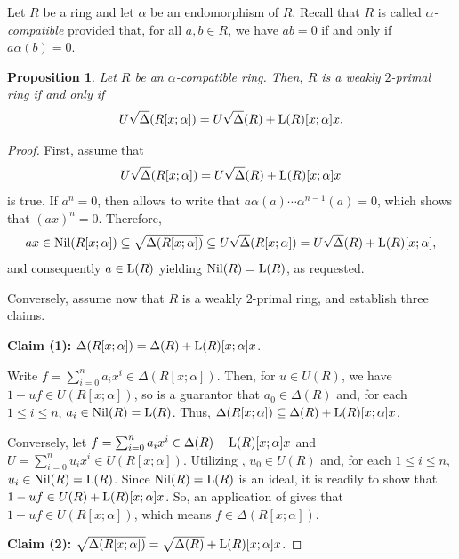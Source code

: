 \documentclass[11pt]{amsart}
\newtheorem{proposition}[theorem]{Proposition}
\theoremstyle{definition}
\begin{document}
Let \( R \) be a ring and let \( \alpha \) be an endomorphism of \( R \). Recall that \( R \) is called \textit{\(\alpha\)-compatible} provided that, for all \( a, b \in R \), we have $ab = 0$ if and only if $a\alpha(b) = 0$.

\begin{proposition}
Let $R$ be an $\alpha$-compatible ring. Then, $R$ is a weakly $2$-primal ring if and only if
$$U\sqrt{\Delta}(R[x; \alpha]) = U\sqrt{\Delta}(R) + {\rm L}(R)[x; \alpha]x.$$
\end{proposition}

\begin{proof}
First, assume that $$U\sqrt{\Delta}(R[x; \alpha]) = U\sqrt{\Delta}(R) + {\rm L}(R)[x; \alpha]x$$ is true. If $a^n=0$, then \cite[Lemma~2.1]{chen} allows to write that $a\alpha(a)\cdots\alpha^{n-1}(a)=0$, which shows that $(ax)^n=0$. Therefore, $$ax \in {\rm Nil}(R[x; \alpha]) \subseteq \sqrt{\Delta(R[x; \alpha])} \subseteq U\sqrt{\Delta}(R[x; \alpha]) = U\sqrt{\Delta}(R) + {\rm L}(R)[x; \alpha],$$ and consequently $a \in {\rm L}(R)$ yielding ${\rm Nil}(R)= {\rm L}(R)$, as requested.

Conversely, assume now that $R$ is a weakly $2$-primal ring, and establish three claims.

\medskip

\textbf{Claim (1):} $\Delta(R[x; \alpha]) = \Delta(R) + {\rm L}(R)[x; \alpha]x$.

\medskip

Write $f=\sum_{i=0}^n a_ix^i \in \Delta(R[x; \alpha])$. Then, for $u \in U(R)$, we have $1-uf \in U(R[x; \alpha])$, so \cite[Corollary~2.14]{chen} is a guarantor that $a_0 \in \Delta (R)$ and, for each $1 \leq i \leq n$, $a_i \in {\rm Nil}(R) ={\rm L}(R)$. Thus, $\Delta(R[x; \alpha]) \subseteq \Delta(R) + {\rm L}(R)[x; \alpha]x$.

Conversely, let $f=\sum_{i=0}^n a_ix^i \in \Delta(R) + {\rm L}(R)[x; \alpha]x$ and $U=\sum_{i=0}^n u_ix^i \in U(R[x; \alpha])$. Utilizing \cite[Corollary~2.14]{chen}, $u_0 \in U(R)$ and, for each $1 \leq i \leq n$, $u_i \in {\rm Nil}(R) ={\rm L}(R)$. Since ${\rm Nil}(R)={\rm L}(R)$ is an ideal, it is readily to show that $1-uf \in U(R)+{\rm L}(R)[x; \alpha]x$. So, an application of \cite[Corollary~2.14]{chen} gives that $1-uf \in U(R[x; \alpha])$, which means $f\in \Delta(R[x; \alpha])$.

\medskip

\textbf{Claim (2):} $\sqrt{\Delta(R[x; \alpha])} = \sqrt{\Delta(R)} + {\rm L}(R)[x; \alpha]x$.


\end{proof}
\end{document}

